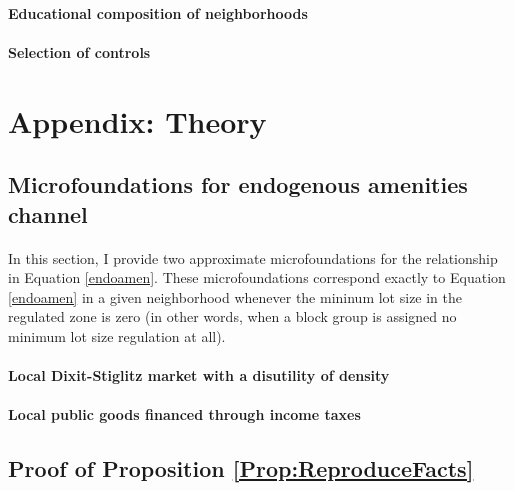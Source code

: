 \documentclass[11pt]{article}
\begin{document}
	\paragraph*{Educational composition of neighborhoods}
	
	\paragraph*{Selection of controls}
	
	
	
	\newpage
	\section{Appendix: Theory}\label{TheoryAppendix}
	
	
	\subsection{Microfoundations for endogenous amenities channel}\label{microfoundations}
	
	\paragraph*{}
	
	In this section, I provide two approximate microfoundations for the relationship in Equation \eqref{endoamen}. These microfoundations correspond exactly to Equation \eqref{endoamen} in a given neighborhood whenever the mininum lot size in the regulated zone is zero (in other words, when a block group is assigned no minimum lot size regulation at all).  
	
	\paragraph*{Local Dixit-Stiglitz market with a disutility of density}
	
	
	
	\paragraph*{Local public goods financed through income taxes}
	
	
	\subsection{Proof of Proposition \ref{Prop:ReproduceFacts}}\label{Proof:ReproduceFacts}
	
\end{document}
